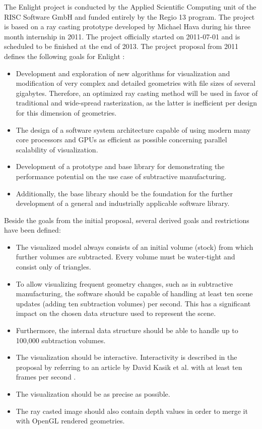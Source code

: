 The Enlight project is conducted by the Applied Scientific Computing unit of the RISC Software GmbH and funded entirely by the Regio 13 program. The project is based on a ray casting prototype developed by Michael Hava during his three month internship \cite{bakk_michael_hava} in 2011. The project officially started on 2011-07-01 and is scheduled to be finished at the end of 2013.
The project proposal from 2011 defines the following goals for Enlight \cite{enlight_proposal} :

\begin{itemize}
	\item Development and exploration of new algorithms for visualization and modification of very complex and detailed geometries with file sizes of several gigabytes. Therefore, an optimized ray casting method will be used in favor of traditional and wide-spread rasterization, as the latter is inefficient per design for this dimension of geometries.
	\item The design of a software system architecture capable of using modern many core processors and GPUs as efficient as possible concerning parallel scalability of visualization.
	\item Development of a prototype and base library for demonstrating the performance potential on the use case of subtractive manufacturing.
	\item Additionally, the base library should be the foundation for the further development of a general and industrially applicable software library.
\end{itemize}

Beside the goals from the initial proposal, several derived goals and restrictions have been defined:

\begin{itemize}
	\item The visualized model always consists of an initial volume (stock) from which further volumes are subtracted. Every volume must be water-tight and consist only of triangles.
	\item To allow visualizing frequent geometry changes, such as in subtractive manufacturing, the software should be capable of handling at least ten scene updates (adding ten subtraction volumes) per second. This has a significant impact on the chosen data structure used to represent the scene.
	\item Furthermore, the internal data structure should be able to handle up to 100,000 subtraction volumes.
	\item The visualization should be interactive. Interactivity is described in the proposal by referring to an article by David Kasik et al. with at least ten frames per second \cite{interactive_framerate}.
	\item The visualization should be as precise as possible.
	\item The ray casted image should also contain depth values in order to merge it with OpenGL rendered geometries.
\end{itemize}

